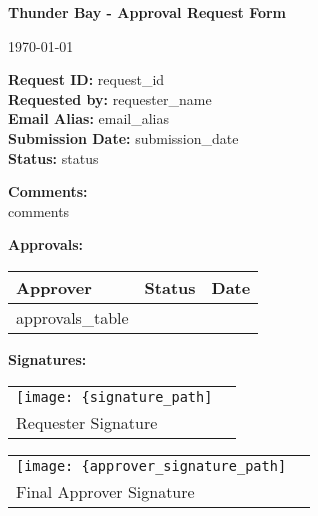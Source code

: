 \documentclass[12pt]{article}
\begin{document}
\begin{center}
    \Large\textbf{Thunder Bay - Approval Request Form}
    
    \vspace{0.5cm}
    \normalsize
    \today
\end{center}

\vspace{1cm}

\noindent\textbf{Request ID:} {{request_id}} \\
\noindent\textbf{Requested by:} {{requester_name}} \\
\noindent\textbf{Email Alias:} {{email_alias}} \\
\noindent\textbf{Submission Date:} {{submission_date}} \\
\noindent\textbf{Status:} {{status}} \\

\vspace{0.5cm}

\noindent\textbf{Comments:} \\
{{comments}}

\vspace{1cm}

\noindent\textbf{Approvals:} \\

\begin{tabular}{|p{4cm}|p{4cm}|p{4cm}|}
    \hline
    \textbf{Approver} & \textbf{Status} & \textbf{Date} \\
    \hline
    {{approvals_table}}
    \hline
\end{tabular}

\vspace{1.5cm}

\noindent\textbf{Signatures:}

\vspace{1cm}

\noindent\begin{tabular}{p{7cm}p{7cm}}
\texttt{[image: \{signature\_path]}} & \\
\cline{1-1}
Requester Signature & \\
\end{tabular}

\vspace{1cm}

\noindent\begin{tabular}{p{7cm}p{7cm}}
\texttt{[image: \{approver\_signature\_path]}} & \\
\cline{1-1}
Final Approver Signature & \\
\end{tabular}
\end{document}
